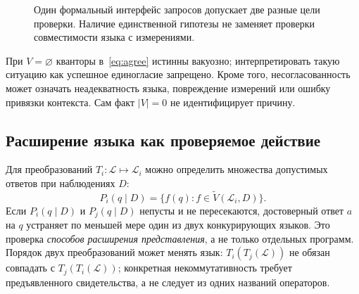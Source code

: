 \documentclass[11pt,a4paper]{article}
\newcommand{\VS}{\widetilde V}
\newcommand{\Agree}{\operatorname{Agree}}
\begin{document}
\begin{figure}[htbp]
\centering
{}
\caption{Один формальный интерфейс запросов допускает две разные цели проверки. Наличие единственной гипотезы не заменяет проверки совместимости языка с измерениями.}\label{fig:query}
\end{figure}

При $V=\varnothing$ кванторы в~\eqref{eq:agree} истинны вакуозно; интерпретировать такую ситуацию как успешное единогласие запрещено. Кроме того, несогласованность может означать неадекватность языка, повреждение измерений или ошибку привязки контекста. Сам факт $|V|=0$ не идентифицирует причину.

\subsection{Расширение языка как проверяемое действие}

Для преобразований $T_i:\mathcal L\mapsto\mathcal L_i$ можно определить множества допустимых ответов при наблюдениях $D$:
\begin{equation}\label{eq:cross}
P_i(q\mid D)=\{f(q):f\in\VS(\mathcal L_i,D)\}.
\end{equation}
Если $P_i(q\mid D)$ и $P_j(q\mid D)$ непусты и не пересекаются, достоверный ответ $a$ на $q$ устраняет по меньшей мере один из двух конкурирующих языков. Это проверка \emph{способов расширения представления}, а не только отдельных программ. Порядок двух преобразований может менять язык: $T_i(T_j(\mathcal L))$ не обязан совпадать с $T_j(T_i(\mathcal L))$; конкретная некоммутативность требует предъявленного свидетельства, а не следует из одних названий операторов.
\end{document}
